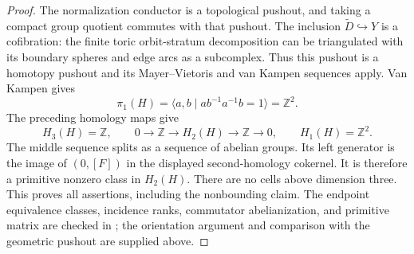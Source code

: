 \begin{proof}
The normalization conductor is a topological pushout, and taking
a compact group quotient commutes with that pushout. The inclusion
\(\widetilde D\hookrightarrow Y\) is a cofibration: the finite
toric orbit-stratum decomposition can be triangulated with its
boundary spheres and edge arcs as a subcomplex. Thus this pushout
is a homotopy pushout and its Mayer--Vietoris and van Kampen
sequences apply. Van Kampen gives
\[
 \pi_1(H)=\langle a,b\mid ab^{-1}a^{-1}b=1\rangle
            =\mathbb Z^2.
\]
The preceding homology maps give
\[
 H_3(H)=\mathbb Z,\qquad
 0\longrightarrow\mathbb Z\longrightarrow H_2(H)
      \longrightarrow\mathbb Z\longrightarrow0,
 \qquad H_1(H)=\mathbb Z^2.
\]
The middle sequence splits as a sequence of abelian groups. Its
left generator is the image of \((0,[F])\) in the displayed
second-homology cokernel. It is therefore a primitive nonzero
class in \(H_2(H)\). There are no cells above dimension three.
This proves all assertions, including the nonbounding claim.
The endpoint equivalence classes, incidence ranks, commutator
abelianization, and primitive matrix are checked in
; the orientation argument
and comparison with the geometric pushout are supplied above.
\end{proof}
